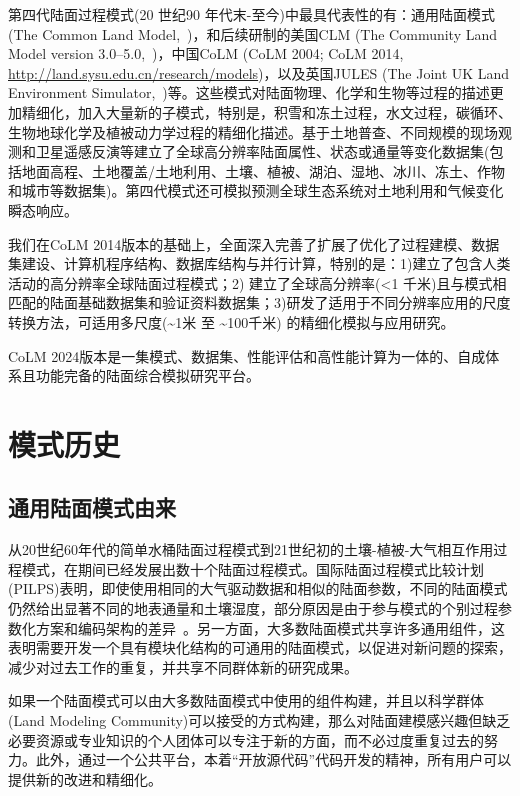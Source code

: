 第四代陆面过程模式(20 世纪90 年代末-至今)中最具代表性的有：通用陆面模式(The Common Land Model,~\citet{dai2003common})，和后续研制的美国CLM (The Community Land Model version 3.0--5.0,~\citet{Oleson2004CLM,lawrence2018})，中国CoLM (CoLM 2004; CoLM 2014, \url{http://land.sysu.edu.cn/research/models})，以及英国JULES (The Joint UK Land Environment Simulator,~\citet{wiltshire2020JULESGL7GlobalLanda})等。这些模式对陆面物理、化学和生物等过程的描述更加精细化，加入大量新的子模式，特别是，积雪和冻土过程，水文过程，碳循环、生物地球化学及植被动力学过程的精细化描述。基于土地普查、不同规模的现场观测和卫星遥感反演等建立了全球高分辨率陆面属性、状态或通量等变化数据集(包括地面高程、土地覆盖/土地利用、土壤、植被、湖泊、湿地、冰川、冻土、作物和城市等数据集)。第四代模式还可模拟预测全球生态系统对土地利用和气候变化瞬态响应。

我们在CoLM 2014版本的基础上，全面深入完善了扩展了优化了过程建模、数据集建设、计算机程序结构、数据库结构与并行计算，特别的是：1)建立了包含人类活动的高分辨率全球陆面过程模式；2) 建立了全球高分辨率(<1 千米)且与模式相匹配的陆面基础数据集和验证资料数据集；3)研发了适用于不同分辨率应用的尺度转换方法，可适用多尺度(\textasciitilde1米 至 \textasciitilde100千米) 的精细化模拟与应用研究。

CoLM 2024版本是一集模式、数据集、性能评估和高性能计算为一体的、自成体系且功能完备的陆面综合模拟研究平台。


\section{模式历史}

\subsection{通用陆面模式由来}
从20世纪60年代的简单水桶陆面过程模式到21世纪初的土壤-植被-大气相互作用过程模式，在期间已经发展出数十个陆面过程模式。国际陆面过程模式比较计划(PILPS)表明，即使使用相同的大气驱动数据和相似的陆面参数，不同的陆面模式仍然给出显著不同的地表通量和土壤湿度，部分原因是由于参与模式的个别过程参数化方案和编码架构的差异~\citep{Henderson-Sellers_95}。另一方面，大多数陆面模式共享许多通用组件，这表明需要开发一个具有模块化结构的可通用的陆面模式，以促进对新问题的探索，减少对过去工作的重复，并共享不同群体新的研究成果。

如果一个陆面模式可以由大多数陆面模式中使用的组件构建，并且以科学群体(Land Modeling Community)可以接受的方式构建，那么对陆面建模感兴趣但缺乏必要资源或专业知识的个人团体可以专注于新的方面，而不必过度重复过去的努力。此外，通过一个公共平台，本着“开放源代码”代码开发的精神，所有用户可以提供新的改进和精细化。

